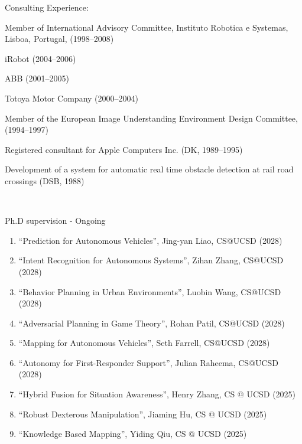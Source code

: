 \documentclass{article}
\newenvironment{sublist}{%
  \begin{list}{}{%
      \setlength{\itemsep}{0em}\setlength{\parsep}{0em}%
      \setlength{\topsep}{0em}\setlength{\parskip}{0em}%
    }%
}%
{ \end{list} }
\begin{document}
\begin{cv}
\begin{cvlist}{Consulting Experience:}
\begin{sublist}
  \item Member of International Advisory Committee, Instituto Robotica e
    Systemas, Lisboa, Portugal, (1998--2008)
  \item iRobot (2004--2006)
  \item ABB (2001--2005)
  \item Totoya Motor Company (2000--2004)
  \item Member of the European Image Understanding Environment Design
    Committee, (1994--1997)
  \item Registered consultant for Apple Computers Inc. (DK, 1989--1995)
  \item Development of a system for automatic real time obstacle
    detection at rail road crossings (DSB, 1988)
  \end{sublist}
\end{cvlist}



\begin{cvlist}{~}

\item[Ph.D supervision - Ongoing]\ \\
\begin{enumerate}
    \item ``Prediction for Autonomous Vehicles'', Jing-yan Liao, CS@UCSD (2028)
    \item ``Intent Recognition for Autonomous Systems'', Zihan Zhang, CS@UCSD (2028)
    \item ``Behavior Planning in Urban Environments'', Luobin Wang, CS@UCSD (2028)
    \item ``Adversarial Planning in Game Theory'', Rohan Patil, CS@UCSD (2028)
    \item ``Mapping for Autonomous Vehicles'', Seth Farrell, CS@UCSD (2028)
    \item ``Autonomy for First-Responder Support'', Julian Raheema, CS@UCSD (2028)
    \item ``Hybrid Fusion for Situation Awareness'', Henry Zhang, CS @  UCSD (2025)
    \item ``Robust Dexterous Manipulation'', Jiaming Hu, CS @ UCSD (2025)
    \item ``Knowledge Based Mapping'', Yiding Qiu, CS @ UCSD (2025)
  \end{enumerate}


\end{cvlist}
\end{cv}
\end{document}
